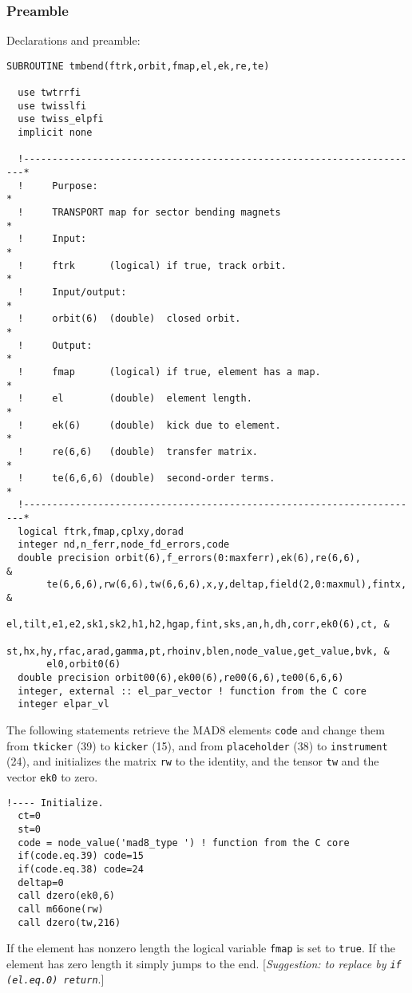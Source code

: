 \documentclass{cern-art} %
\renewcommand{\L}[1]{\lstinline[firstnumber=last]{#1}}
\newcommand{\madeight}{\mbox{MAD8}\xspace}
\begin{document}
\subsubsection{Preamble}
Declarations and preamble:
\begin{lstlisting}[firstnumber=auto]
SUBROUTINE tmbend(ftrk,orbit,fmap,el,ek,re,te)

  use twtrrfi
  use twisslfi
  use twiss_elpfi
  implicit none

  !----------------------------------------------------------------------*
  !     Purpose:                                                         *
  !     TRANSPORT map for sector bending magnets                         *
  !     Input:                                                           *
  !     ftrk      (logical) if true, track orbit.                        *
  !     Input/output:                                                    *
  !     orbit(6)  (double)  closed orbit.                                *
  !     Output:                                                          *
  !     fmap      (logical) if true, element has a map.                  *
  !     el        (double)  element length.                              *
  !     ek(6)     (double)  kick due to element.                         *
  !     re(6,6)   (double)  transfer matrix.                             *
  !     te(6,6,6) (double)  second-order terms.                          *
  !----------------------------------------------------------------------*
  logical ftrk,fmap,cplxy,dorad
  integer nd,n_ferr,node_fd_errors,code
  double precision orbit(6),f_errors(0:maxferr),ek(6),re(6,6),           &
       te(6,6,6),rw(6,6),tw(6,6,6),x,y,deltap,field(2,0:maxmul),fintx,   &
       el,tilt,e1,e2,sk1,sk2,h1,h2,hgap,fint,sks,an,h,dh,corr,ek0(6),ct, &
       st,hx,hy,rfac,arad,gamma,pt,rhoinv,blen,node_value,get_value,bvk, &
       el0,orbit0(6)
  double precision orbit00(6),ek00(6),re00(6,6),te00(6,6,6)
  integer, external :: el_par_vector ! function from the C core
  integer elpar_vl
\end{lstlisting}
The following statements retrieve the \madeight elements \L{code} and change them from \L{tkicker} (39) to \L{kicker} (15), and from \L{placeholder} (38) to \L{instrument} (24), and initializes the matrix \L{rw} to the identity, and the tensor \L{tw} and the vector \L{ek0} to zero.
\begin{lstlisting}[firstnumber=last]
  !---- Initialize.
  ct=0
  st=0
  code = node_value('mad8_type ') ! function from the C core
  if(code.eq.39) code=15
  if(code.eq.38) code=24
  deltap=0
  call dzero(ek0,6)
  call m66one(rw)
  call dzero(tw,216)
\end{lstlisting}
If the element has nonzero length the logical variable \L{fmap} is set to \L{true}.
If the element has zero length it simply jumps to the end. [{\em Suggestion: to replace by \L{if (el.eq.0) return}}.]
\end{document}
